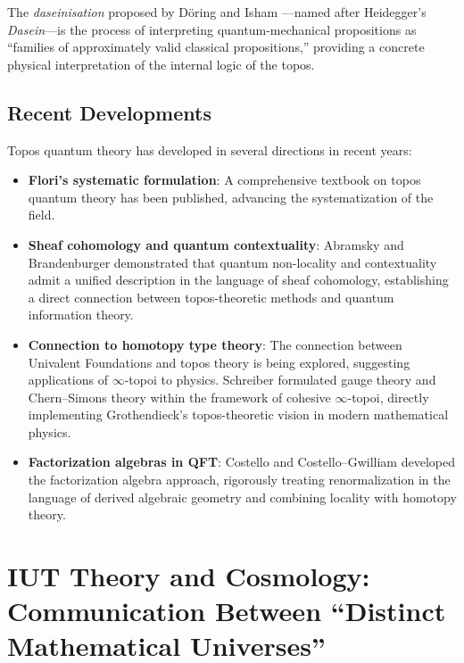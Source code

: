 \documentclass[12pt,a4paper]{article}
\theoremstyle{definition}
\begin{document}
The \emph{daseinisation} proposed by D\"{o}ring and Isham \cite{DoeringIsham2008a}---named after Heidegger's \emph{Dasein}---is the process of interpreting quantum-mechanical propositions as ``families of approximately valid classical propositions,'' providing a concrete physical interpretation of the internal logic of the topos.

\subsection{Recent Developments}

Topos quantum theory has developed in several directions in recent years:

\begin{itemize}[leftmargin=2em]
  \item \textbf{Flori's systematic formulation}: A comprehensive textbook on topos quantum theory \cite{Flori2013} has been published, advancing the systematization of the field.
  \item \textbf{Sheaf cohomology and quantum contextuality}: Abramsky and Brandenburger \cite{AbramskyBrandenburger2011} demonstrated that quantum non-locality and contextuality admit a unified description in the language of sheaf cohomology, establishing a direct connection between topos-theoretic methods and quantum information theory.
  \item \textbf{Connection to homotopy type theory}: The connection between Univalent Foundations \cite{HoTTbook2013} and topos theory is being explored, suggesting applications of $\infty$-topoi \cite{Lurie2009} to physics. Schreiber \cite{Schreiber2013} formulated gauge theory and Chern--Simons theory within the framework of cohesive $\infty$-topoi, directly implementing Grothendieck's topos-theoretic vision in modern mathematical physics.
  \item \textbf{Factorization algebras in QFT}: Costello \cite{Costello2011} and Costello--Gwilliam \cite{CostelloGwilliam2017} developed the factorization algebra approach, rigorously treating renormalization in the language of derived algebraic geometry and combining locality with homotopy theory.
\end{itemize}


\newpage
\section{IUT Theory and Cosmology: Communication Between ``Distinct Mathematical Universes''}
\label{sec:iut}
\end{document}
